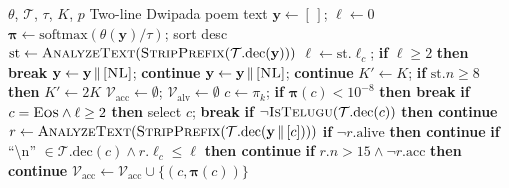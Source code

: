 \begin{algorithm}[H]
\caption{Strategy~1: Rejection Sampling}
\label{alg:rejection-sampling}
\scriptsize
\begin{algorithmic}[1]
\Require $\theta$, $\mathcal{T}$, $\tau$, $K$, $p$
\Ensure Two-line Dwipada poem text
\State $\mathbf{y} \gets [\,]$;\; $\ell \gets 0$
    \State $\boldsymbol{\pi} \gets
           \text{softmax}(\theta(\mathbf{y})/\tau)$;\;
           sort desc
    \State $\text{st} \gets \textsc{AnalyzeText}(
           \textsc{StripPrefix}(
           \mathcal{T}.\text{dec}(\mathbf{y})))$
    \State $\ell \gets \text{st}.\ell_c$;\;
           \textbf{if} $\ell \ge 2$ \textbf{then break}
    \State {}
        \State $\mathbf{y} \gets \mathbf{y} \,\|\,
               [\textsc{NL}]$;\; \textbf{continue}
    \EndIf
        \State $\mathbf{y} \gets \mathbf{y} \,\|\,
               [\textsc{NL}]$;\; \textbf{continue}
    \EndIf
    \State $K' \gets K$;\;
           \textbf{if} $\text{st}.n \ge 8$
           \textbf{then} $K' \gets 2K$
    \State {}
    \State $\mathcal{V}_{\text{acc}} \gets \emptyset$;\;
           $\mathcal{V}_{\text{alv}} \gets \emptyset$
        \State $c \gets \pi_k$;\;
               \textbf{if} $\boldsymbol{\pi}(c) < 10^{-8}$
               \textbf{then break}
        \State \textbf{if} $c = \textsc{Eos} \wedge
               \ell \ge 2$ \textbf{then} select $c$;
               \textbf{break}
        \State \textbf{if} $\neg\textsc{IsTelugu}(
               \mathcal{T}.\text{dec}(c))$
               \textbf{then continue}
        \State $r \gets \textsc{AnalyzeText}(
               \textsc{StripPrefix}(
               \mathcal{T}.\text{dec}(
               \mathbf{y} \,\|\, [c])))$
        \State \textbf{if} $\neg r.\text{alive}$
               \textbf{then continue}
        \State \textbf{if} ``\textbackslash n''
               $\in \mathcal{T}.\text{dec}(c)
               \wedge r.\ell_c \le \ell$
               \textbf{then continue}
        \State \textbf{if} $r.n > 15 \wedge
               \neg r.\text{acc}$
               \textbf{then continue}
            \State $\mathcal{V}_{\text{acc}} \gets
                   \mathcal{V}_{\text{acc}} \cup
                   \{(c, \boldsymbol{\pi}(c))\}$

\end{algorithmic}
\end{algorithm}

